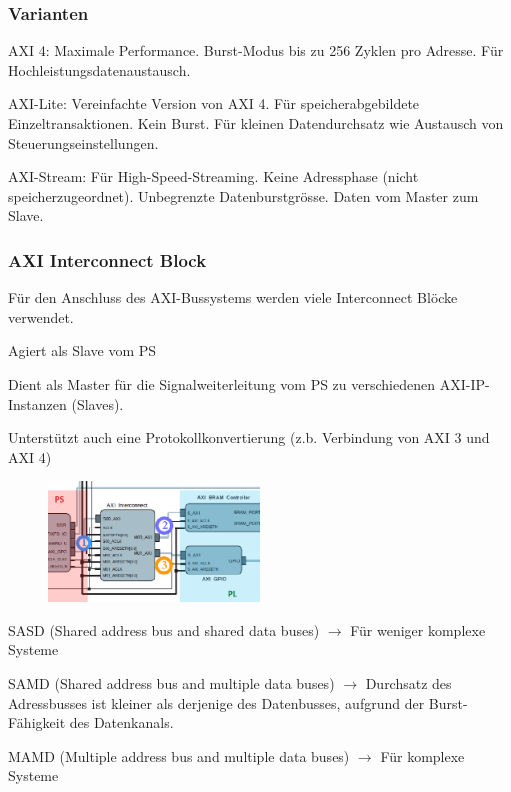 \subsubsection{Varianten}
\begin{compactitem}
    \item AXI 4: Maximale Performance. Burst-Modus bis zu 256 Zyklen pro Adresse. Für Hochleistungsdatenaustausch.
    \item AXI-Lite: Vereinfachte Version von AXI 4. Für speicherabgebildete Einzeltransaktionen. Kein Burst. Für kleinen Datendurchsatz wie Austausch von Steuerungseinstellungen.
    \item AXI-Stream: Für High-Speed-Streaming. Keine Adressphase (nicht speicherzugeordnet). Unbegrenzte Datenburstgrösse. Daten vom Master zum Slave.
\end{compactitem}

\begin{multicols}{2}
\subsubsection{AXI Interconnect Block}
Für den Anschluss des AXI-Bussystems werden viele Interconnect Blöcke verwendet.
\begin{compactitem}
    \item Agiert als Slave vom PS
    \item Dient als Master für die Signalweiterleitung vom PS zu verschiedenen AXI-IP-Instanzen (Slaves).
    \item Unterstützt auch eine Protokollkonvertierung (z.b. Verbindung von AXI 3 und AXI 4)
\end{compactitem}
\vfill\null
\columnbreak
\begin{figure}[H]
  \includegraphics[width=0.5\textwidth]{images/AXI_Interconnect.png}
 \end{figure}
\end{multicols}
\begin{compactitem}
  \item SASD (Shared address bus and shared data buses) $\rightarrow$ Für weniger komplexe Systeme
  \item SAMD (Shared address bus and multiple data buses) $\rightarrow$ Durchsatz des Adressbusses ist kleiner als derjenige des Datenbusses, aufgrund der Burst-Fähigkeit des Datenkanals.
  \item MAMD (Multiple address bus and multiple data buses) $\rightarrow$ Für komplexe Systeme
\end{compactitem}

